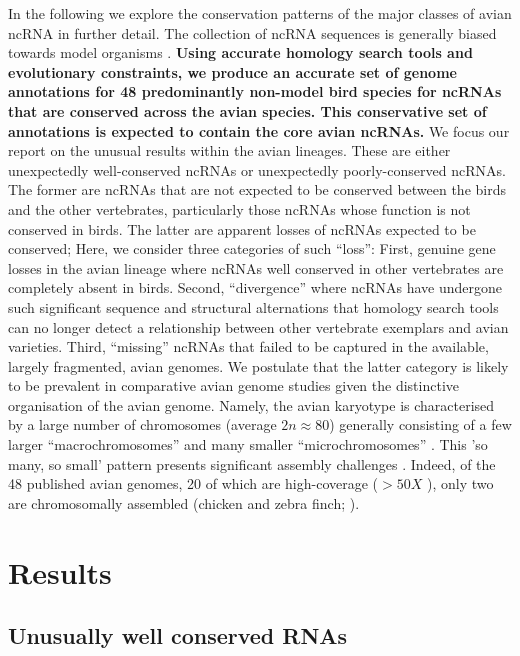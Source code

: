 \documentclass[10pt]{bmc_article}
\newenvironment{bmcformat}{\begin{raggedright}\baselineskip20pt\sloppy\setboolean{publ}{false}}{\end{raggedright}\baselineskip20pt\sloppy}
\begin{document}
\begin{bmcformat}
In the following we explore the conservation patterns of the major
classes of avian ncRNA in further detail. The collection of ncRNA
sequences is generally biased towards model organisms
\cite{Gardner:2010,Hoeppner:2012}.  {\bf Using accurate homology
  search tools and evolutionary constraints, we produce an accurate
  set of genome annotations for 48 predominantly non-model bird
  species for ncRNAs that are conserved across the avian species. This
  conservative set of annotations is expected to contain the core
  avian ncRNAs.}  We focus our report on the unusual results within
the avian lineages. These are either unexpectedly well-conserved
ncRNAs or unexpectedly poorly-conserved ncRNAs. The former are ncRNAs
that are not expected to be conserved between the birds and the other
vertebrates, particularly those ncRNAs whose function is not conserved
in birds.  The latter are apparent losses of ncRNAs expected to be
conserved; Here, we consider three categories of such ``loss'': First,
genuine gene losses in the avian lineage where ncRNAs well conserved
in other vertebrates are completely absent in birds.  Second,
``divergence'' where ncRNAs have undergone such significant sequence
and structural alternations that homology search tools can no longer
detect a relationship between other vertebrate exemplars and avian
varieties.  Third, ``missing'' ncRNAs that failed to be captured in
the available, largely fragmented, avian genomes.  We postulate that
the latter category is likely to be prevalent in comparative avian
genome studies given the distinctive organisation of the avian
genome. Namely, the avian karyotype is characterised by a large number
of chromosomes (average $2n \approx 80$) generally consisting of a few
larger ``macrochromosomes'' and many smaller ``microchromosomes''
\cite{Griffin:2007}. This ’so many, so small’ pattern presents
significant assembly challenges \cite{Ellegren:2005}. Indeed, of the
48 published avian genomes, 20 of which are high-coverage ($>50X$ ),
only two are chromosomally assembled (chicken and zebra finch;
\cite{birds:14,Warren:2010}).



\section*{Results}


\subsection*{Unusually well conserved RNAs}


\end{bmcformat}
\end{document}
